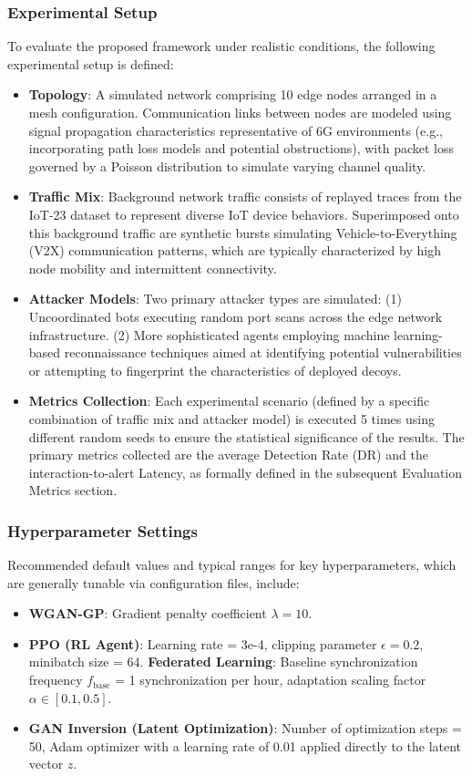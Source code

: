 \documentclass{article}
\begin{document}
\subsubsection{Experimental Setup}
To evaluate the proposed framework under realistic conditions, the following experimental setup is defined:
\begin{itemize}[label=\textbf{\textbullet}]
    \item \textbf{Topology}: A simulated network comprising 10 edge nodes arranged in a mesh configuration. Communication links between nodes are modeled using signal propagation characteristics representative of 6G environments (e.g., incorporating path loss models and potential obstructions), with packet loss governed by a Poisson distribution to simulate varying channel quality.
    \item \textbf{Traffic Mix}: Background network traffic consists of replayed traces from the IoT-23 dataset \cite{Garcia2020IoT23} to represent diverse IoT device behaviors. Superimposed onto this background traffic are synthetic bursts simulating Vehicle-to-Everything (V2X) communication patterns, which are typically characterized by high node mobility and intermittent connectivity.
    \item \textbf{Attacker Models}: Two primary attacker types are simulated: (1) Uncoordinated bots executing random port scans across the edge network infrastructure. (2) More sophisticated agents employing machine learning-based reconnaissance techniques aimed at identifying potential vulnerabilities or attempting to fingerprint the characteristics of deployed decoys.
    \item \textbf{Metrics Collection}: Each experimental scenario (defined by a specific combination of traffic mix and attacker model) is executed 5 times using different random seeds to ensure the statistical significance of the results. The primary metrics collected are the average Detection Rate (DR) and the interaction-to-alert Latency, as formally defined in the subsequent Evaluation Metrics section.
\end{itemize}

\subsubsection{Hyperparameter Settings}
Recommended default values and typical ranges for key hyperparameters, which are generally tunable via configuration files, include:
\begin{itemize}[label=\textbf{\textbullet}]
    \item \textbf{WGAN-GP}: Gradient penalty coefficient \(\lambda = 10\).
    \item \textbf{PPO (RL Agent)}: Learning rate = 3e-4, clipping parameter \(\epsilon = 0.2\), minibatch size = 64.
    \textbf{Federated Learning}: Baseline synchronization frequency \( f_{\mathrm{base}} \) = 1 synchronization per hour, adaptation scaling factor \(\alpha \in [0.1, 0.5] \).
    \item \textbf{GAN Inversion (Latent Optimization)}: Number of optimization steps = 50, Adam optimizer with a learning rate of 0.01 applied directly to the latent vector \( z \).
\end{itemize}
\end{document}
